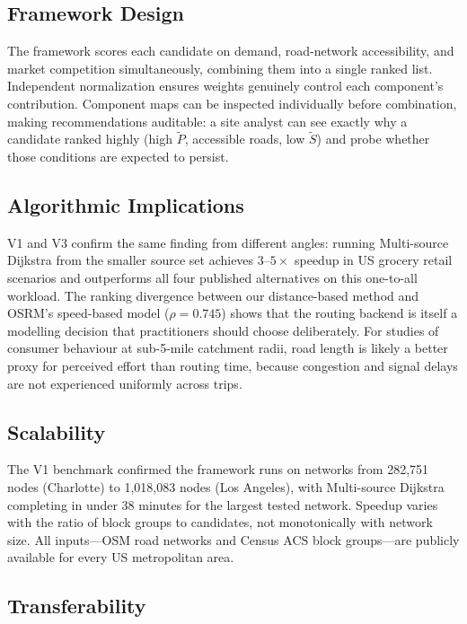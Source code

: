 \documentclass[conference]{IEEEtran}
\begin{document}
\subsection{Framework Design}

The framework scores each candidate on demand, road-network
accessibility, and market competition simultaneously, combining them
into a single ranked list. Independent normalization ensures weights
genuinely control each component's contribution. Component maps can
be inspected individually before combination, making recommendations
auditable: a site analyst can see exactly why a candidate ranked
highly (high $\widetilde{P}$, accessible roads, low $\widetilde{S}$)
and probe whether those conditions are expected to persist.

\subsection{Algorithmic Implications}

V1 and V3 confirm the same finding from different angles: running
Multi-source Dijkstra from the smaller source set achieves
$3$--$5\times$ speedup in US grocery retail scenarios and outperforms
all four published alternatives on this one-to-all workload. The
ranking divergence between our distance-based method and OSRM's
speed-based model ($\rho = 0.745$) shows that the routing backend is
itself a modelling decision that practitioners should choose
deliberately. For studies of consumer behaviour at sub-5-mile
catchment radii, road length is likely a better proxy for perceived
effort than routing time, because congestion and signal delays are
not experienced uniformly across trips.

\subsection{Scalability}

The V1 benchmark confirmed the framework runs on networks from
282{,}751 nodes (Charlotte) to 1{,}018{,}083 nodes (Los Angeles),
with Multi-source Dijkstra completing in under 38 minutes for the
largest tested network. Speedup varies with the ratio of block groups
to candidates, not monotonically with network size. All inputs---OSM
road networks and Census ACS block groups---are publicly available
for every US metropolitan area.

\subsection{Transferability}
\end{document}
